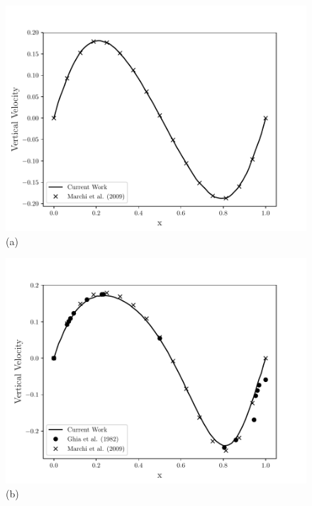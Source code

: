 \begin{figure}[H]
     \centering
     \begin{minipage}{.5\linewidth}
      \centering
      \includegraphics[scale=0.53]{./02_chaps/cap_validation/figure/Re_10_v_profile.pdf}\\
      (a)
     \end{minipage}%
     \begin{minipage}{.5\linewidth}
      \centering
      \includegraphics[scale=0.53]{./02_chaps/cap_validation/figure/Re_100_v_profile.pdf}\\
      (b)
     \end{minipage}
     \begin{minipage}{.5\linewidth}

\end{minipage}
\end{figure}
